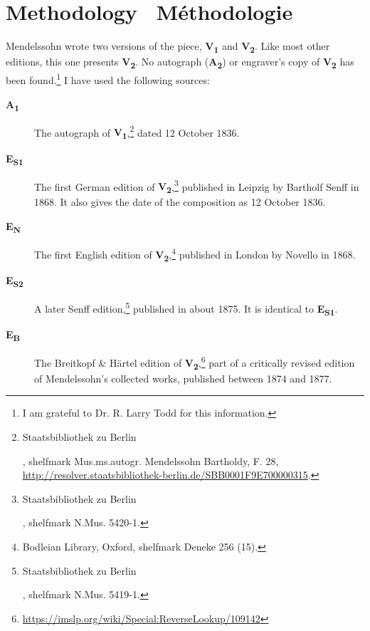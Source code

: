 \documentclass[a4paper, 12pt]{book}
\newcommand{\source}[2]{\textbf{#1\textsubscript{#2}}}
\newcommand{\bigdot}[0]{{\Large \textbullet}}
\begin{document}
\ifdef{\critical}
  {%
    \section*{Methodology \bigdot\ \foreignlanguage{french}{Méthodologie}}

    Mendelssohn wrote two versions of the piece, \source{V}{1} and
    \source{V}{2}. Like most other editions, this one presents
    \source{V}{2}. No autograph (\source{A}{2}) or engraver's copy of
    \source{V}{2} has been found.\footnote{I am grateful to
      Dr. R. Larry Todd for this information.} I have used the
    following sources:
    
    \begin{description}
    \item[\source{A}{1}] The autograph of
      \source{V}{1},\footnote{\begin{otherlanguage}{ngerman}Staatsbibliothek
          zu Berlin\end{otherlanguage}, shelfmark
          Mus.ms.autogr. Mendelssohn Bartholdy, F. 28,
          \url{http://resolver.staatsbibliothek-berlin.de/SBB0001F9E700000315}.}
      dated 12 October 1836.
    \item[\source{E}{S1}] The first German edition of
      \source{V}{2},\footnote{\begin{otherlanguage}{ngerman}Staatsbibliothek
          zu Berlin\end{otherlanguage}, shelfmark N.Mus. 5420-1.}
      published in Leipzig by Bartholf Senff in 1868. It also gives
      the date of the composition as 12 October 1836.
    \item[\source{E}{N}] The first English edition of
      \source{V}{2},\footnote{Bodleian Library, Oxford, shelfmark
        Deneke 256 (15).} published in London by Novello in 1868.
    \item[\source{E}{S2}] A later Senff
      edition,\footnote{\begin{otherlanguage}{ngerman}Staatsbibliothek
          zu Berlin\end{otherlanguage}, shelfmark N.Mus. 5419-1.}
      published in about 1875. It is identical to \source{E}{S1}.
    \item[\source{E}{B}] The Breitkopf \& Härtel edition of
      \source{V}{2},\footnote{\url{https://imslp.org/wiki/Special:ReverseLookup/109142}\label{imslp}}
      part of a critically revised edition of Mendelssohn's collected
      works, published between 1874 and 1877.
    \end{description}

}
\end{document}
